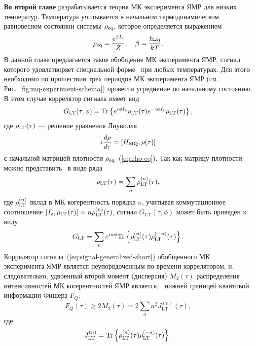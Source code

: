 \textbf{Во второй главе} разрабатывается теория МК эксперимента ЯМР для низких температур.
Температура учитывается в начальном термодинамическом равновесном состоянии системы $\rho_\mathrm{eq}$,
которое определяется выражением
%
\begin{equation}\label{eq:rho-eq}
  \rho_\mathrm{eq} = \dfrac{e^{\beta I_\mathrm{z}}}{Z}, \quad \beta = \frac{\hbar\omega_{0}}{kT},
\end{equation}
%
\rhoEqExplanatoryNote
В данной главе предлагается такое обобщение МК эксперимента ЯМР,
сигнал которого удовлетворяет специальной форме~\cite{Garttner2018} при любых температурах.
Для этого необходимо по прошествии трех периодов МК эксперимента ЯМР (см. Рис.~\ref{fig:mq-experiment-schema}) провести усреднение по начальному состоянию.
В этом случае коррелятор сигнала имеет вид
%
\begin{equation}\label{eq:signal-generalized-short}
  G_\mathrm{LT}(\tau, \phi) = \mathrm{Tr} \left\{ 
   e^{i\phi I_\mathrm{z}} \rho_\mathrm{LT} (\tau)
   e^{-i\phi I_\mathrm{z}} \rho_\mathrm{LT} (\tau)
   \right\},
\end{equation}
где $\rho_\mathrm{LT}(\tau)$  --- решение уравнения Лиувилля
%
\begin{equation}
  i \frac{d \rho}{d \tau} = \left[H_\mathrm{MQ}, \rho(\tau)\right]
\end{equation}
%
с начальной матрицей плотности $\rho_\mathrm{eq}$~(\ref{eq:rho-eq}).
%
Так как матрицу плотности можно представить~\cite{Feldman1997b}
в виде ряда
\begin{equation}
  \rho_\mathrm{LT} (\tau) = \sum_n \rho_\mathrm{LT}^{(n)} (\tau),
\end{equation}
%
где $\rho_\mathrm{LT}^{(n)}$ вклад в МК когерентность порядка $n$,
учитывая коммутационное соотношение $\left[I_\mathrm{z}, \rho_\mathrm{LT}(\tau)\right] = n \rho_\mathrm{LT}^{(n)}(\tau)$,
сигнал $G_\mathrm{LT}(\tau, \phi)$ может быть приведен к виду
%
\begin{equation}
  G_\mathrm{LT} = \sum_n e^{in\phi} \mathrm{Tr} \left\{ 
    \rho_\mathrm{LT}^{(n)}(\tau)\rho_\mathrm{LT}^{(-n)}(\tau)
   \right\}.
\end{equation}
%
Коррелятор сигнала~(\ref{eq:signal-generalized-short}) обобщенного МК эксперимента ЯМР является неупорядоченным по времени коррелятором,
и, следовательно, удвоенный второй момент (дисперсия) $M_2(\tau)$ распределения интенсивностей МК когерентностей ЯМР
является,~\cite{Garttner2018} нижней границей квантовой информации Фишера $F_{Q}$:
%
\begin{equation}\label{eq:qfi-low-bound}
  F_{Q}(\tau)
  \geq 2M_2(\tau)
  = 2 \sum\limits_n n^2 J_\mathrm{LT}^{(n)} (\tau),
\end{equation}
%
где
\begin{equation}\label{eq:coherence-k}
  J_\mathrm{LT}^{(n)} = \mathrm{Tr} \left\{ \rho_\mathrm{LT}^{(n)}(\tau)\rho_\mathrm{LT}^{(-n)}(\tau) \right\}.
\end{equation}


